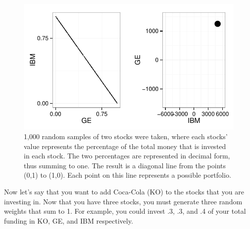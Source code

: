 \documentclass{article}\usepackage{graphicx, color}
\makeatletter
\def\maxwidth{ %
  \ifdim\Gin@nat@width>\linewidth
    \linewidth
  \else
    \Gin@nat@width
  \fi
}
\newenvironment{knitrout}{}{} %
\makeatother
\begin{document}
\begin{figure}[H]
\begin{knitrout}
\color{fgcolor}
\includegraphics[width=\maxwidth]{figure/figure3} 

\end{knitrout}

\caption{1,000 random samples of two stocks were taken, where each stocks' value represents the percentage of the total money that is invested in each stock. The two percentages are represented in decimal form, thus summing to one. The result is a diagonal line from the points (0,1) to (1,0). Each point on this line represents a possible portfolio.}
\end{figure}

Now let's say that you want to add Coca-Cola (KO) to the stocks that you are investing in. Now that you have three stocks, you must generate three random weights that sum to 1. For example, you could invest .3, .3, and .4 of your total funding in KO, GE, and IBM respectively. 
  
\end{document}

